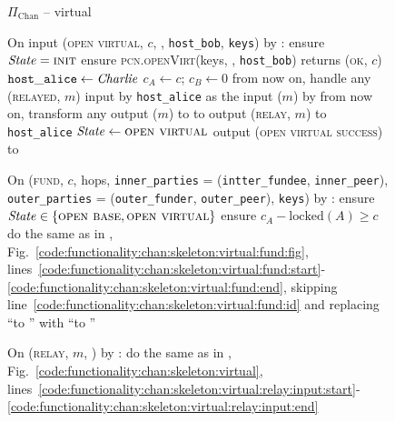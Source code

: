 \begin{figure}[H]
  \begin{protocolbox}{$\Pi_{\mathrm{Chan}}$ -- virtual}
    \begin{algorithmic}[1]
      \State {}
      \State {}
      \State On input (\textsc{open virtual}, $c$, \bob, \texttt{host\_bob},
      \texttt{keys}) by \charlie:
      \label{code:protocol:chan:skeleton:vchan:open-virtual}
      \Indent
        \State ensure $\mathit{State} = \textsc{init}$
        \State ensure \textsc{pcn.openVirt}(keys, \bob, \texttt{host\_bob})
        returns (\textsc{ok}, $c$)
        \label{code:protocol:chan:skeleton:vchan:ln}
        \State $\mathtt{host\_alice} \gets \mathit{Charlie}$
        \State $c_A \gets c$; $c_B \gets 0$
        \State from now on, handle any (\textsc{relayed}, $m$) input by
        \texttt{host\_alice} as the input ($m$) by \environment
        \State from now on, transform any output ($m$) to \environment to
        output (\textsc{relay}, $m$) to \texttt{host\_alice}
        \State $\mathit{State} \gets \textsc{open virtual}$
        \State output (\textsc{open virtual success}) to \charlie
        \label{code:protocol:chan:skeleton:vchan:open-virtual:output}
      \EndIndent
      \Statex

      \State On (\textsc{fund}, $c$, hops, \texttt{inner\_parties} =
      (\texttt{intter\_fundee}, \texttt{inner\_peer}), \texttt{outer\_parties} =
      (\texttt{outer\_funder}, \texttt{outer\_peer}), \texttt{keys}) by
      \environment:
      \Indent
        \State ensure $\mathit{State} \in \{\textsc{open base}, \textsc{open
        virtual}\}$
        \State ensure $c_A - \mathrm{locked}(A) \geq c$
        \State do the same as in \fchan,
        Fig.~\ref{code:functionality:chan:skeleton:virtual:fund:fig},
        lines~\ref{code:functionality:chan:skeleton:virtual:fund:start}-\ref{code:functionality:chan:skeleton:virtual:fund:end},
        skipping line~\ref{code:functionality:chan:skeleton:virtual:fund:id} and
        replacing ``to \alice'' with ``to \environment''
        \label{code:protocol:chan:skeleton:vchan}
      \EndIndent
      \Statex

      \State On (\textsc{relay}, $m$, \charlie) by \environment:
      \Indent
        \State do the same as in \fchan,
        Fig.~\ref{code:functionality:chan:skeleton:virtual},
        lines~\ref{code:functionality:chan:skeleton:virtual:relay:input:start}-\ref{code:functionality:chan:skeleton:virtual:relay:input:end}
      \EndIndent
      \Statex


\end{algorithmic}
\end{protocolbox}
\end{figure}
